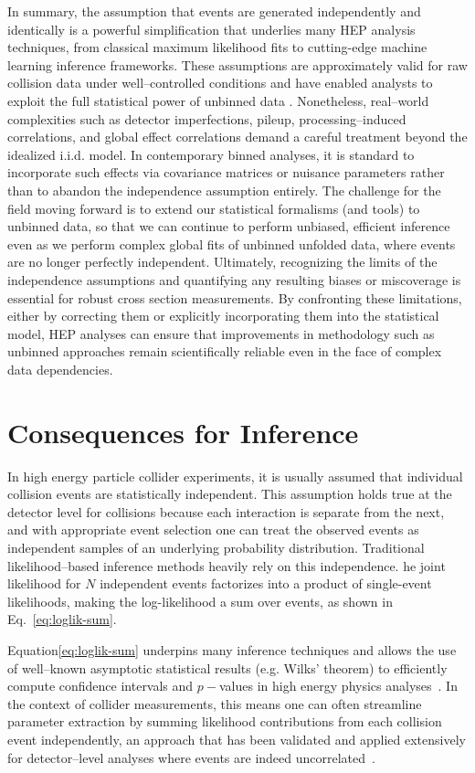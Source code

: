     In summary, the assumption that events are generated independently and identically is a powerful simplification that underlies many HEP analysis techniques, from classical maximum likelihood fits to cutting-edge machine learning inference frameworks.
    These assumptions are approximately valid for raw collision data under well--controlled conditions and have enabled analysts to exploit the full statistical power of unbinned data .
    Nonetheless, real--world complexities such as detector imperfections, pileup, processing--induced correlations, and global effect correlations demand a careful treatment beyond the idealized i.i.d. model.
    In contemporary binned analyses, it is standard to incorporate such effects via covariance matrices or nuisance parameters rather than to abandon the independence assumption entirely.
    The challenge for the field moving forward is to extend our statistical formalisms (and tools) to unbinned data, so that we can continue to perform unbiased, efficient inference even as we perform complex global fits of unbinned unfolded data, where events are no longer perfectly independent.
    Ultimately, recognizing the limits of the independence assumptions and quantifying any resulting biases or miscoverage is essential for robust cross section measurements.
    By confronting these limitations, either by correcting them or explicitly incorporating them into the statistical model, HEP analyses can ensure that improvements in methodology such as unbinned approaches remain scientifically reliable even in the face of complex data dependencies.
\section{Consequences for Inference}
    \label{sec:impact}
    In high energy particle collider experiments, it is usually assumed that individual collision events are statistically independent.
    This assumption holds true at the detector level for collisions because each interaction is separate from the next, and with appropriate event selection one can treat the observed events as independent samples of an underlying probability distribution.
    Traditional likelihood--based inference methods heavily rely on this independence.
    he joint likelihood for $N$ independent events factorizes into a product of single-event likelihoods, making the log-likelihood a sum over events, as shown in Eq.~\ref{eq:loglik-sum}.
    
    Equation\ref{eq:loglik-sum} underpins many inference techniques and allows the use of well--known asymptotic statistical results (e.g. Wilks’ theorem) to efficiently compute confidence intervals and $p-$values in high energy physics analyses~.
    In the context of collider measurements, this means one can often streamline parameter extraction by summing likelihood contributions from each collision event independently, an approach that has been validated and applied extensively for detector--level analyses where events are indeed uncorrelated~.

